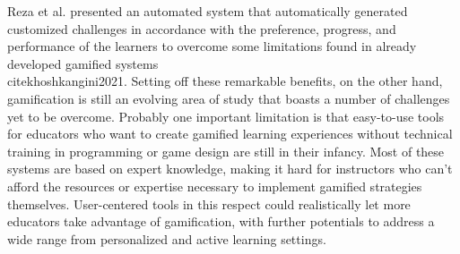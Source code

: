 Reza et al. presented an automated system that automatically generated customized challenges in accordance with the preference, progress, and performance of the learners to overcome some limitations found in already developed gamified systems \\cite{khoshkangini2021}. Setting off these remarkable benefits, on the other hand, gamification is still an evolving area of study that boasts a number of challenges yet to be overcome. Probably one important limitation is that easy-to-use tools for educators who want to create gamified learning experiences without technical training in programming or game design are still in their infancy. Most of these systems are based on expert knowledge, making it hard for instructors who can't afford the resources or expertise necessary to implement gamified strategies themselves. User-centered tools in this respect could realistically let more educators take advantage of gamification, with further potentials to address a wide range from personalized and active learning settings.